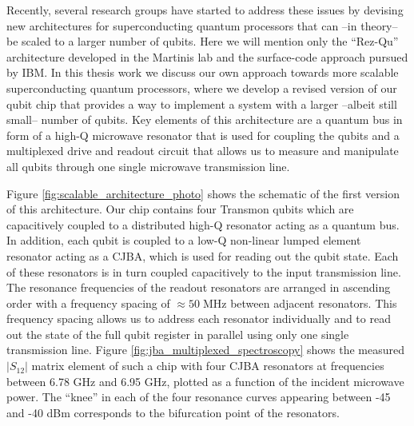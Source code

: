 Recently, several research groups have started to address these issues by devising new architectures for superconducting quantum processors that can --in theory-- be scaled to a larger number of qubits. Here we will mention only the ``Rez-Qu'' architecture \citep{galiautdinov_resonatorzero-qubit_2012} developed in the Martinis lab and the surface-code approach \citep{divincenzo_fault-tolerant_2009} pursued by IBM. In this thesis work we discuss our own approach towards more scalable superconducting quantum processors, where we develop a revised version of our qubit chip that provides a way to implement a system with a larger --albeit still small-- number of qubits. Key elements of this architecture are a quantum bus in form of a high-Q microwave resonator that is used for coupling the qubits and a multiplexed drive and readout circuit that allows us to measure and manipulate all qubits through one single microwave transmission line. 

Figure \ref{fig:scalable_architecture_photo} shows the schematic of the first version of this architecture. Our chip contains four Transmon qubits which are capacitively coupled to a distributed high-Q resonator acting as a quantum bus. In addition, each qubit is coupled to a low-Q non-linear lumped element resonator acting as a CJBA, which is used for reading out the qubit state. Each of these resonators is in turn coupled capacitively to the input transmission line. The resonance frequencies of the readout resonators are arranged in ascending order with a frequency spacing of \mbox{$\approx 50\;\mathrm{MHz}$} between adjacent resonators. This frequency spacing allows us to address each resonator individually and to read out the state of the full qubit register in parallel using only one single transmission line. Figure \ref{fig:jba_multiplexed_spectroscopy} shows the measured $|S_{12}|$ matrix element of such a chip with four CJBA resonators at frequencies between 6.78 GHz and 6.95 GHz, plotted as a function of the incident microwave power. The ``knee'' in each of the four resonance curves appearing between -45 and -40 dBm corresponds to the bifurcation point of the resonators.

